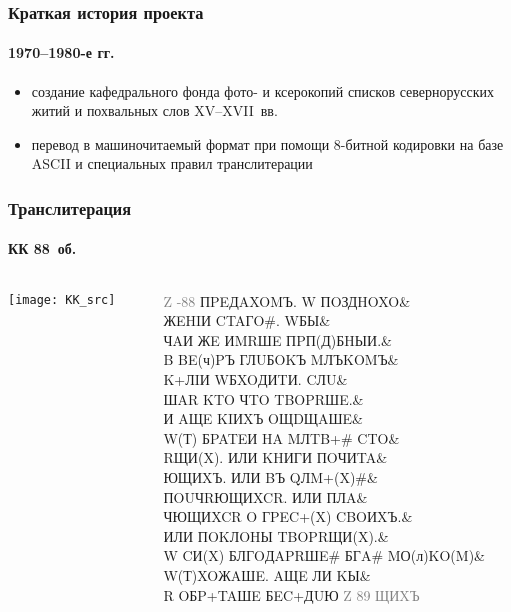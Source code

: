 \frame{\titlepage}

\begin{frame}
  \frametitle{Краткая история проекта}
  \framesubtitle{1970--1980-е гг.}

  \begin{block}{}
    \begin{itemize}
      \item создание кафедрального фонда фото- и ксерокопий списков севернорусских житий и похвальных слов XV--XVII~вв.\autocite{averina_alexeeva_gerd:1996}
      \item перевод в машиночитаемый формат при помощи 8-битной кодировки на базе ASCII и специальных правил транслитерации
    \end{itemize}
  \end{block}
\end{frame}

\begin{frame}
  \frametitle{Транслитерация}
  \framesubtitle{КК 88~об.}

  \begin{columns}[c]
    \begin{column}{6cm}
      \texttt{[image: KK\_src]}
    \end{column}

    \begin{column}{6cm} \ttfamily \footnotesize
      \textcolor{gray}{Z -88} ПPEДAXOMЪ. W ПOЗДHOXO\& \\
      ЖEHIИ CTAГO\#. WБЫ\& \\
      ЧAИ ЖE ИMRШE ПPП(Д)БHЫИ.\& \\
      B BE(ч)PЪ ГЛUБOKЪ MЛЪKOMЪ\& \\
      K+ЛIИ WБXOДИTИ. CЛU\& \\
      ШAR KTO ЧTO TBOPRШE.\& \\
      И AЩE KIИXЪ OЩDЩAШE\& \\
      W(Т) БPATEИ HA MЛTB+\# CTO\& \\
      RЩИ(X). ИЛИ KHИГИ ПOЧИTA\& \\
      ЮЩИXЪ. ИЛИ BЪ QЛM+(X)\#\& \\
      ПOUЧRЮЩИXCR. ИЛИ ПЛA\& \\
      ЧЮЩИXCR O ГPEC+(X) CBOИXЪ.\& \\
      ИЛИ ПOKЛOHЫ TBOPRЩИ(X).\& \\
      W CИ(X) БЛГOДAPRШE\# БГA\# MО(л)KO(M)\& \\
      W(Т)XOЖAШE. AЩE ЛИ KЫ\& \\
      R OБP+TAШE БEC+ДUЮ \textcolor{gray}{Z 89 ЩИXЪ}
    \end{column}
  \end{columns}
\end{frame}

